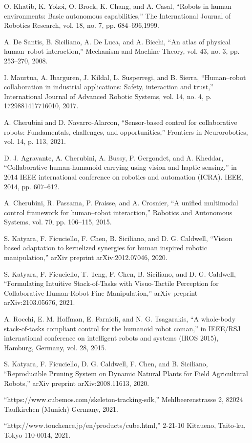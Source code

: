 \documentclass[letterpaper, 10 pt, conference]{ieeeconf}  %
\begin{document}
\begin{thebibliography}{99}

 O. Khatib, K. Yokoi, O. Brock, K. Chang, and A. Casal, “Robots in human environments: Basic autonomous capabilities,” The International Journal of Robotics Research, vol. 18, no. 7, pp. 684–696,1999.

 A. De Santis, B. Siciliano, A. De Luca, and A. Bicchi, “An atlas of physical human–robot interaction,” Mechanism and Machine Theory, vol. 43, no. 3, pp. 253–270, 2008.

 I. Maurtua, A. Ibarguren, J. Kildal, L. Susperregi, and B. Sierra, “Human–robot collaboration in industrial applications: Safety, interaction and trust,” International Journal of Advanced Robotic Systems, vol. 14, no. 4, p. 1729881417716010, 2017.

 A. Cherubini and D. Navarro-Alarcon, “Sensor-based control for collaborative robots: Fundamentals, challenges, and opportunities,” Frontiers in Neurorobotics, vol. 14, p. 113, 2021.

 D. J. Agravante, A. Cherubini, A. Bussy, P. Gergondet, and A. Kheddar, “Collaborative human-humanoid carrying using vision and haptic sensing,” in 2014 IEEE international conference on robotics and automation (ICRA). IEEE, 2014, pp. 607–612.


 A. Cherubini, R. Passama, P. Fraisse, and A. Crosnier, “A unified multimodal control framework for human–robot interaction,” Robotics and Autonomous Systems, vol. 70, pp. 106–115, 2015.

 S. Katyara, F. Ficuciello, F. Chen, B. Siciliano, and D. G. Caldwell, “Vision based adaptation to kernelized synergies for human inspired robotic manipulation,” arXiv preprint arXiv:2012.07046, 2020.

 S. Katyara, F. Ficuciello, T. Teng, F. Chen, B. Siciliano, and D. G. Caldwell, “Formulating Intuitive Stack-of-Tasks with Visuo-Tactile Perception for Collaborative Human-Robot Fine Manipulation,” arXiv preprint arXiv:2103.05676, 2021.

 A. Rocchi, E. M. Hoffman, E. Farnioli, and N. G. Tsagarakis, “A whole-body stack-of-tasks compliant control for the humanoid robot coman,” in IEEE/RSJ international conference on intelligent robots and systems (IROS 2015), Hamburg, Germany, vol. 28, 2015.

 S. Katyara, F. Ficuciello, D. G. Caldwell, F. Chen, and B. Siciliano, “Reproducible Pruning System on Dynamic Natural Plants for Field Agricultural Robots,” arXiv preprint arXiv:2008.11613, 2020.

 “https://www.cubemos.com/skeleton-tracking-sdk,” Mehlbeerenstrasse 2, 82024 Taufkirchen (Munich) Germany, 2021.

 “http://www.touchence.jp/en/products/cube.html,” 2-21-10 Kitaueno, Taito-ku, Tokyo 110-0014, 2021.

\end{thebibliography}
\end{document}
